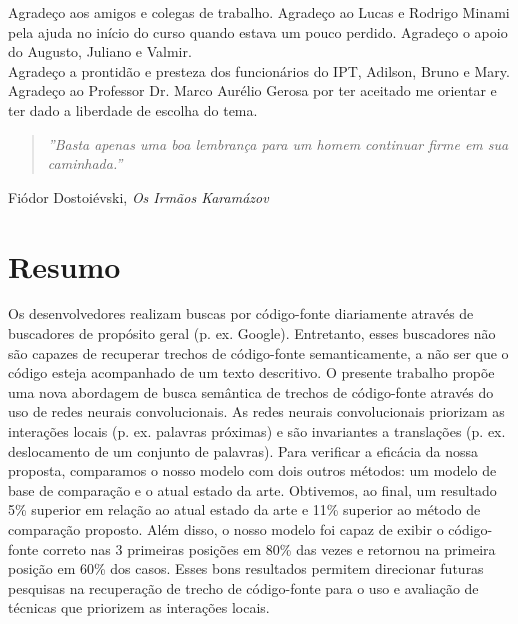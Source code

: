 \documentclass[12pt,twoside,a4paper]{book} %
\begin{document}
Agradeço aos amigos e colegas de trabalho. Agradeço ao Lucas e Rodrigo Minami pela ajuda no início do curso quando estava um pouco perdido. Agradeço o apoio do Augusto, Juliano e Valmir.
\\

Agradeço a prontidão e presteza dos funcionários do IPT, Adilson, Bruno e Mary.
\\

Agradeço ao Professor Dr. Marco Aurélio Gerosa por ter aceitado me orientar e ter dado a liberdade de escolha do tema. 

\newpage
\thispagestyle{empty}

\begin{center}
        \vspace*{18 cm}
        \begin{quote}
            \textit{''Basta apenas uma boa lembrança para um homem continuar firme em sua caminhada.''}
        \end{quote}
        \begin{flushright}
        Fiódor Dostoiévski, \textit{Os Irmãos Karamázov}\\
        \end{flushright}
    \end{center}


\pagebreak
\chapter*{Resumo}

Os desenvolvedores realizam buscas por código-fonte diariamente através de buscadores de propósito geral (p. ex. Google). Entretanto, esses buscadores não são capazes de recuperar trechos de código-fonte semanticamente, a não ser que o código esteja acompanhado de um texto descritivo. O presente trabalho propõe uma nova abordagem de busca semântica de trechos de código-fonte através do uso de redes neurais convolucionais. As redes neurais convolucionais priorizam as interações locais (p. ex. palavras próximas) e são invariantes a translações (p. ex. deslocamento de um conjunto de palavras). Para verificar a eficácia da nossa proposta, comparamos o nosso modelo com dois outros métodos: um modelo de base de comparação e o atual estado da arte. Obtivemos, ao final, um resultado 5\% superior em relação ao atual estado da arte e 11\% superior ao método de comparação proposto. Além disso, o nosso modelo foi capaz de exibir o código-fonte correto nas 3 primeiras posições em 80\% das vezes e retornou na primeira posição em 60\% dos casos. Esses bons resultados permitem direcionar futuras pesquisas na recuperação de trecho de código-fonte para o uso e avaliação de técnicas que priorizem as interações locais.
\\
\end{document}
